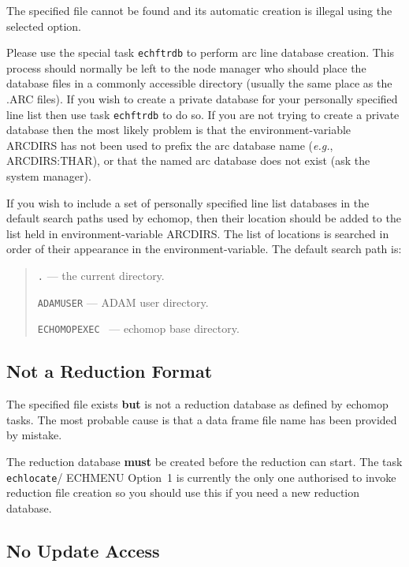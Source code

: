 \documentclass[twoside,11pt]{article}
\newcommand{\htmlref}[2]{#1}
\newcommand{\xlabel}[1]{}
\renewcommand{\_}{\texttt{\symbol{95}}}
\newcommand{\mlabel}[1]{\xlabel{#1}\label{#1}}
\newcommand{\myindex}[1]{\index{#1}}
\newcommand{\myindex}[1]{}
\begin{document}
The specified file cannot be found and its automatic creation is illegal
using the selected option.

Please use the special task \texttt{ech\_ftrdb} to perform arc line database
creation. This process should normally be left to the node manager
who should place the database files in a commonly accessible
directory (usually the same place as the .ARC files). \myindex{Arc line
database creation} If you wish to create a private database for your
personally specified line list then use task \texttt{ech\_ftrdb} to do so. If
you are not trying to create a private database then the most likely
problem is that the environment-variable ARCDIRS has not been used to prefix
the arc database name ({\it{e.g.}}, ARCDIRS:THAR),
or that the named arc database does not exist (ask the system
manager).

If you wish to include a set of personally specified line list databases
in the default search paths used by {\sc echomop,} then their location should
be added to the list held in environment-variable ARCDIRS.  The list of
locations is searched in order of their appearance in the
environment-variable.  The default search path is:

\begin{quote}

   {\tt .} --- the current directory.

   {\tt ADAM\_USER} --- ADAM user directory.

   {\tt ECHOMOP\_EXEC } --- {\sc echomop} base directory.

\end{quote}

\subsection{\mlabel{not_a_reduction_format} Not a Reduction Format}

The specified file exists {\bf but} is not a reduction database as
defined by {\sc echomop} tasks. The most probable cause is that a data frame
file name has been provided by mistake.

The reduction database {\bf must} be created before the reduction
can start. The task
\htmlref{{\tt ech\_locate}/ ECHMENU Option~1}{ech_locate}
is currently the only one authorised to invoke reduction file creation so you
should use this if you need a new reduction database.

\subsection{\mlabel{no_update_access} No Update Access}
\end{document}
